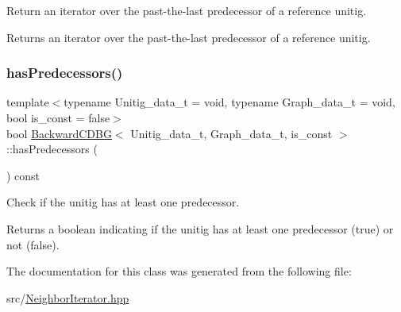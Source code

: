 Return an iterator over the past-\/the-\/last predecessor of a reference unitig. 

\begin{DoxyReturn}{Returns}
an iterator over the past-\/the-\/last predecessor of a reference unitig. 
\end{DoxyReturn}
\mbox{\label{classBackwardCDBG_afd32793764f72b23624fc6384d934412}} 
\subsubsection{\texorpdfstring{has\+Predecessors()}{hasPredecessors()}}
{\footnotesize\ttfamily template$<$typename Unitig\+\_\+data\+\_\+t  = void, typename Graph\+\_\+data\+\_\+t  = void, bool is\+\_\+const = false$>$ \\
bool \hyperlink{classBackwardCDBG}{Backward\+C\+D\+BG}$<$ Unitig\+\_\+data\+\_\+t, Graph\+\_\+data\+\_\+t, is\+\_\+const $>$\+::has\+Predecessors (\begin{DoxyParamCaption}{ }\end{DoxyParamCaption}) const}



Check if the unitig has at least one predecessor. 

\begin{DoxyReturn}{Returns}
a boolean indicating if the unitig has at least one predecessor (true) or not (false). 
\end{DoxyReturn}


The documentation for this class was generated from the following file\+:\begin{DoxyCompactItemize}
\item 
src/\hyperlink{NeighborIterator_8hpp}{Neighbor\+Iterator.\+hpp}\end{DoxyCompactItemize}
